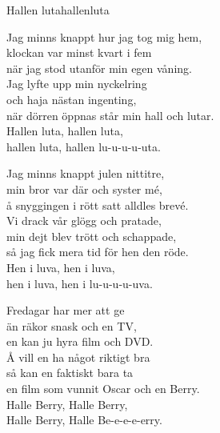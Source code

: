 \begin{song}{Hallen luta}{hallenluta}
\begin{vers}
Jag minns knappt hur jag tog mig hem,\\
klockan var minst kvart i fem\\
när jag stod utanför min egen våning.\\
Jag lyfte upp min nyckelring\\
och haja nästan ingenting,\\
när dörren öppnas står min hall och lutar.\\
Hallen luta, hallen luta,\\
hallen luta, hallen lu-u-u-u-uta.\\
\end{vers}
\begin{vers}
Jag minns knappt julen nittitre,\\
min bror var där och syster mé,\\
å snyggingen i rött satt alldles brevé.\\
Vi drack vår glögg och pratade,\\
min dejt blev trött och schappade,\\
så jag fick mera tid för hen den röde.\\
Hen i luva, hen i luva,\\
hen i luva, hen i lu-u-u-u-uva.\\
\end{vers}
\begin{vers}
Fredagar har mer att ge\\
än räkor snask och en TV,\\
en kan ju hyra film och DVD.\\
Å vill en ha något riktigt bra\\
så kan en faktiskt bara ta\\
en film som vunnit Oscar och en Berry.\\
Halle Berry, Halle Berry,\\
Halle Berry, Halle Be-e-e-e-erry.\\
\end{vers}
\end{song}